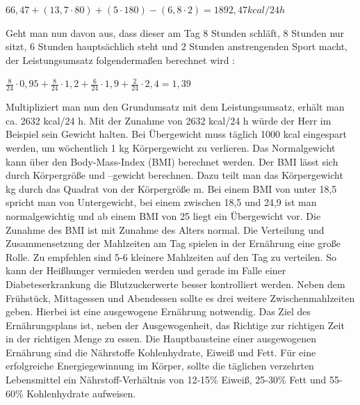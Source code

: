 \documentclass[a4paper,11pt]{article}%
\renewcommand{\\}{\vspace*{0.5\baselineskip} \newline}
\begin{document}
		\centerline{$66,47 + (13,7 \cdot 80) + (5 \cdot 180) - (6,8 \cdot 2) {=} 1892,47 kcal/24 h $}\newline
	\\
	Geht man nun davon aus, dass dieser am Tag 8 Stunden schläft, 8 Stunden nur sitzt, 6 Stunden hauptsächlich steht und 2 Stunden anstrengenden Sport macht, der Leistungsumsatz folgendermaßen berechnet wird \cite{SG}:\newline
		\\
		\centerline{$\frac{8}{24} \cdot 0,95 + \frac {8}{24} \cdot 1,2 + \frac{6}{24} \cdot 1,9 + \frac {2}{24} \cdot 2,4 {=} 1,39$}\newline
		\\
	Multipliziert man nun den Grundumsatz mit dem Leistungsumsatz, erhält man ca. 2632 kcal/24 h. Mit der Zunahme von 2632 kcal/24 h würde der Herr im Beispiel sein Gewicht halten. Bei Übergewicht muss täglich 1000 kcal eingespart werden, um wöchentlich 1 kg Körpergewicht zu verlieren.\newline
	Das Normalgewicht kann über den Body-Mass-Index (BMI) berechnet werden. Der BMI lässt sich durch Körpergröße und –gewicht berechnen. Dazu teilt man das Körpergewicht kg durch das Quadrat von der Körpergröße m.\newline
	Bei einem BMI von unter 18,5 spricht man von Untergewicht, bei einem zwischen 18,5 und 24,9 ist man normalgewichtig und ab einem BMI von 25 liegt ein Übergewicht vor. Die Zunahme des BMI ist mit Zunahme des Alters normal.\newline
	Die Verteilung und Zusammensetzung der Mahlzeiten am Tag spielen in der Ernährung eine große Rolle. Zu empfehlen sind 5-6 kleinere Mahlzeiten auf den Tag zu verteilen. So kann der Heißhunger vermieden werden und gerade im Falle einer Diabeteserkrankung die Blutzuckerwerte besser kontrolliert werden. Neben dem Frühstück, Mittagessen und Abendessen sollte es drei weitere Zwischenmahlzeiten geben. Hierbei ist eine ausgewogene Ernährung notwendig. Das Ziel des Ernährungsplans ist, neben der Ausgewogenheit, das Richtige zur richtigen Zeit in der richtigen Menge zu essen. Die Hauptbausteine einer ausgewogenen Ernährung sind die Nährstoffe Kohlenhydrate, Eiweiß und Fett. Für eine erfolgreiche Energiegewinnung im Körper, sollte die täglichen verzehrten Lebensmittel ein Nährstoff-Verhältnis von 12-15\% Eiweiß, 25-30\% Fett und 55-60\% Kohlenhydrate aufweisen.\cite{SG} 
		
\end{document}
